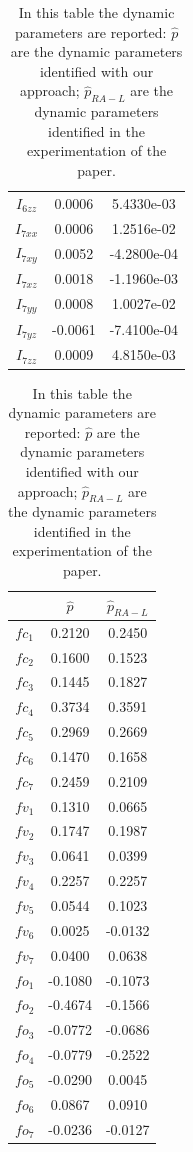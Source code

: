 \documentclass{article}
\begin{document}
\begin{table}
\begin{center}
\begin{tabular}{|c|cc|}
$ I_{6zz} $ & 0.0006 & 5.4330e-03\\
$ I_{7xx} $ & 0.0006 & 1.2516e-02\\
$ I_{7xy} $ & 0.0052 & -4.2800e-04\\
$ I_{7xz} $ & 0.0018 & -1.1960e-03\\
$ I_{7yy} $ & 0.0008 & 1.0027e-02\\
$ I_{7yz} $ & -0.0061 & -7.4100e-04\\
$ I_{7zz} $ & 0.0009 & 4.8150e-03\\
\hline
\end{tabular}
\hspace{1cm}
\begin{tabular}{|c|cc|}
\hline
& $\hat{p}$ & $\hat{p}_{RA-L}$\\ 
\hline
$ fc_1 $ & 0.2120 & 0.2450\\
$ fc_2 $ & 0.1600 & 0.1523\\
$ fc_3 $ & 0.1445 & 0.1827\\
$ fc_4 $ & 0.3734 & 0.3591\\
$ fc_5 $ & 0.2969 & 0.2669\\
$ fc_6 $ & 0.1470 & 0.1658\\
$ fc_7 $ & 0.2459 & 0.2109\\
$ fv_1 $ & 0.1310 & 0.0665\\
$ fv_2 $ & 0.1747 & 0.1987\\
$ fv_3 $ & 0.0641 & 0.0399\\
$ fv_4 $ & 0.2257 & 0.2257\\
$ fv_5 $ & 0.0544 & 0.1023\\
$ fv_6 $ & 0.0025 & -0.0132\\
$ fv_7 $ & 0.0400 & 0.0638\\
$ fo_1 $ & -0.1080 & -0.1073\\
$ fo_2 $ & -0.4674 & -0.1566\\
$ fo_3 $ & -0.0772 & -0.0686\\
$ fo_4 $ & -0.0779 & -0.2522\\
$ fo_5 $ & -0.0290 & 0.0045\\
$ fo_6 $ & 0.0867 & 0.0910\\
$ fo_7 $ & -0.0236 & -0.0127\\
\hline
\end{tabular}
\end{center}
\caption{In this table the dynamic parameters are reported: $\hat{p}$ are the dynamic parameters identified with our approach; $\hat{p}_{RA-L}$ are the dynamic parameters identified in the experimentation of the paper.}
\end{table}
\end{document}
